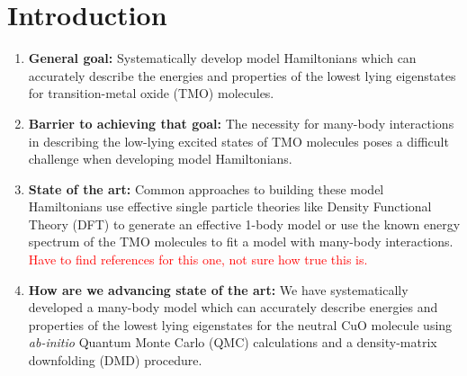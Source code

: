 \documentclass{article}
\begin{document}
\section{Introduction}
\begin{enumerate}
\item \textbf{General goal: }
Systematically develop model Hamiltonians which can accurately describe the energies and properties of the lowest lying eigenstates for transition-metal oxide (TMO) molecules.

\item \textbf{Barrier to achieving that goal: } The necessity for many-body interactions in describing the low-lying excited states of TMO molecules poses a difficult challenge when developing model Hamiltonians.

\item \textbf{State of the art: } Common approaches to building these model Hamiltonians use effective single particle theories like Density Functional Theory (DFT) to generate an effective 1-body model or use the known energy spectrum of the TMO molecules to fit a model with many-body interactions. 
\textcolor{red}{Have to find references for this one, not sure how true this is.}

\item\textbf{How are we advancing state of the art: } We have systematically developed a many-body model which can accurately describe energies and properties of the lowest lying eigenstates for the neutral CuO molecule using \textit{ab-initio} Quantum Monte Carlo (QMC) calculations and a density-matrix downfolding (DMD) procedure. 
\end{enumerate}

\end{document}
